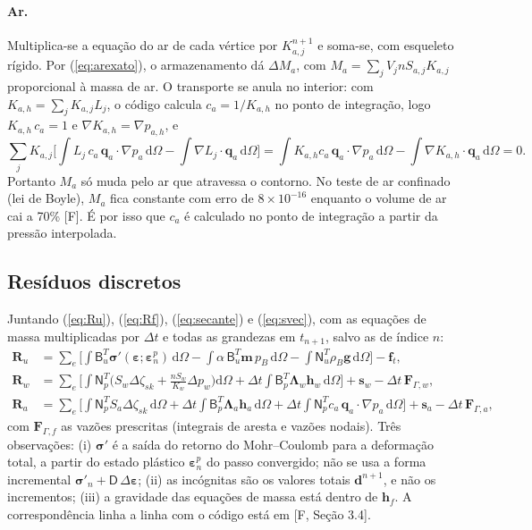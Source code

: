 \documentclass[11pt,a4paper]{article}
\newcommand{\vq}{\bm q}
\newcommand{\vg}{\bm g}
\newcommand{\tsig}{\bm\sigma}
\newcommand{\teps}{\bm\varepsilon}
\newcommand{\mt}[1]{\mathsf{#1}}
\newcommand{\dd}{\mathrm d}
\begin{document}
\paragraph{Ar.} Multiplica-se a equação do ar de cada vértice por $K_{a,j}^{n+1}$ e soma-se,
com esqueleto rígido. Por (\ref{eq:arexato}), o armazenamento dá $\Delta M_a$, com
$M_a=\sum_jV_jnS_{a,j}K_{a,j}$ proporcional à massa de ar. O transporte se anula no
interior: com $K_{a,h}=\sum_jK_{a,j}L_j$, o código calcula $c_a=1/K_{a,h}$ no ponto de
integração, logo $K_{a,h}\,c_a=1$ e $\nabla K_{a,h}=\nabla p_{a,h}$, e
\begin{equation}
\sum_jK_{a,j}\Big[\int L_j\,c_a\,\vq_a\cdot\nabla p_a\,\dd\Omega
-\int\nabla L_j\cdot\vq_a\,\dd\Omega\Big]
=\int K_{a,h}c_a\,\vq_a\cdot\nabla p_a\,\dd\Omega-\int\nabla K_{a,h}\cdot\vq_a\,\dd\Omega=0 .
\label{eq:conserva_a}
\end{equation}
Portanto $M_a$ só muda pelo ar que atravessa o contorno. No teste de ar confinado (lei de
Boyle), $M_a$ fica constante com erro de $8\times10^{-16}$ enquanto o volume de ar cai a 70\%
[F]. É por isso que $c_a$ é calculado no ponto de integração a partir da pressão interpolada.

\subsection{Resíduos discretos}
Juntando (\ref{eq:Ru}), (\ref{eq:Rf}), (\ref{eq:secante}) e (\ref{eq:svec}), com as equações
de massa multiplicadas por $\Delta t$ e todas as grandezas em $t_{n+1}$, salvo as de índice
$n$:
\begin{equation}
\begin{aligned}
\mathbf R_u&=\sum_e\Big[\int\mt B_u^T\tsig'(\teps;\teps^p_n)\,\dd\Omega
-\int\alpha\,\mt B_u^T\bm m\,p_B\,\dd\Omega-\int\mt N_u^T\rho_B\vg\,\dd\Omega\Big]
-\mathbf f_t,\\
\mathbf R_w&=\sum_e\Big[\int\mt N_p^T\Big(S_w\Delta\zeta_{sk}+\frac{nS_w}{K_w}\Delta p_w\Big)\dd\Omega
+\Delta t\int\mt B_p^T\bm\Lambda_w\bm h_w\,\dd\Omega\Big]+\mathbf s_w
-\Delta t\,\mathbf F_{\Gamma,w},\\
\mathbf R_a&=\sum_e\Big[\int\mt N_p^TS_a\Delta\zeta_{sk}\,\dd\Omega
+\Delta t\int\mt B_p^T\bm\Lambda_a\bm h_a\,\dd\Omega
+\Delta t\int\mt N_p^Tc_a\,\vq_a\cdot\nabla p_a\,\dd\Omega\Big]+\mathbf s_a
-\Delta t\,\mathbf F_{\Gamma,a},
\end{aligned}
\label{eq:residuos}
\end{equation}
com $\mathbf F_{\Gamma,f}$ as vazões prescritas (integrais de aresta e vazões nodais). Três
observações: (i) $\tsig'$ é a saída do retorno do Mohr--Coulomb para a deformação total, a
partir do estado plástico $\teps^p_n$ do passo convergido; não se usa a forma incremental
$\tsig'_n+\mt D\,\Delta\teps$; (ii) as incógnitas são os valores totais $\mathbf d^{n+1}$, e
não os incrementos; (iii) a gravidade das equações de massa está dentro de $\bm h_f$. A
correspondência linha a linha com o código está em [F, Seção 3.4].
\end{document}

